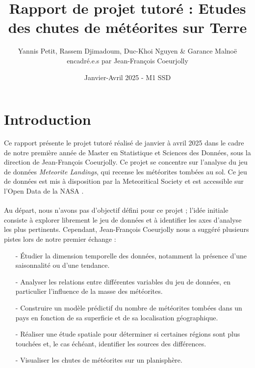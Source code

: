 \documentclass[12pt]{article}
\begin{document}
\title{Rapport de projet tutoré : Etudes des chutes de météorites sur Terre}
\author{Yannis Petit, Rassem Djimadoum, Duc-Khoi Nguyen \& Garance Malnoë \\ encadré.e.s par Jean-François Coeurjolly}
\date{Janvier-Avril 2025 - M1 SSD}

\maketitle
\tableofcontents
\clearpage
{}
\section{Introduction}
Ce rapport présente le projet tutoré réalisé de janvier à avril 2025 dans le cadre de notre première année de Master en Statistique et Sciences des Données, sous la direction de Jean-François Coeurjolly. Ce projet se concentre sur l'analyse du jeu de données \textit{Meteorite Landings}, qui recense les météorites tombées au sol. Ce jeu de données est mis à disposition par la Meteoritical Society et est accessible sur l'Open Data de la NASA \cite{OpenData_NASA}.\\
\\
Au départ, nous n'avons pas d'objectif défini pour ce projet ; l'idée initiale consiste à explorer librement le jeu de données et à identifier les axes d'analyse les plus pertinents. Cependant, Jean-François Coeurjolly nous a suggéré plusieurs pistes lors de notre premier échange :\\
\begin{itemize}
	\item[-] Étudier la dimension temporelle des données, notamment la présence d'une saisonnalité ou d'une tendance.\\
	\item[-] Analyser les relations entre différentes variables du jeu de données, en particulier l'influence de la masse des météorites.\\
	\item[-] Construire un modèle prédictif du nombre de météorites tombées dans un pays en fonction de sa superficie et de sa localisation géographique.\\
	\item[-] Réaliser une étude spatiale pour déterminer si certaines régions sont plus touchées et, le cas échéant, identifier les sources des différences.\\
	\item[-] Visualiser les chutes de météorites sur un planisphère.\\
\end{itemize}
\end{document}
